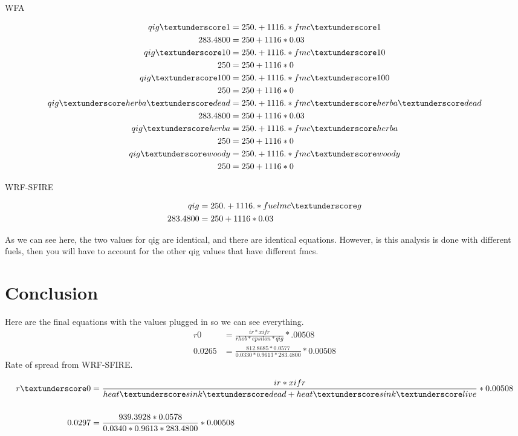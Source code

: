 \documentclass{article}
\newcommand\und{\textunderscore}
\begin{document}
WFA

\begin{equation}
\label{qig_WFA}
	\begin{split}
	qig\und 1         &= 250. + 1116.*fmc\und 1 \\
	283.4800 &= 250 + 1116 * 0.03 \\
qig\und 10        &= 250. + 1116.*fmc\und 10 \\
250 &= 250 + 1116 * 0 \\
qig\und 100       &= 250. + 1116.*fmc\und 100 \\
250 &= 250 + 1116 * 0 \\
qig\und herba\und dead &= 250. + 1116.*fmc\und herba\und dead \\
283.4800 &= 250 + 1116 * 0.03 \\
qig\und herba     &= 250. + 1116.*fmc\und herba \\
250 &= 250 + 1116 * 0 \\
qig\und woody     &= 250. + 1116.*fmc\und woody \\
250 &= 250 + 1116 * 0 
\end{split}
\end{equation}

WRF-SFIRE


\begin{equation}
	\begin{split}
		qig &= 250. + 1116.*fuelmc \textunderscore g \\
		283.4800 &= 250 + 1116 * 0.03
	\end{split}
\end{equation}

As we can see here, the two values for qig are identical, and there are identical equations. However, is this analysis is done with different fuels, then you will have to account for the other qig values that have different fmcs. 


\section{Conclusion}
Here are the final equations with the values plugged in so we can see everything. 
\begin{equation}
	\label{WRF-ROS}
	\begin{split}
		r0 &= \frac{ir*xifr}{rhob * epsilon *qig} * .00508 \\
		0.0265 &= \frac{812.8685 * 0.0577}{0.0330 * 0.9613 * 283.4800} * 0.00508
	\end{split}
\end{equation}
Rate of spread from WRF-SFIRE. 

	\begin{equation}
	\label{r0_WFA_2}
	\begin{split}
	r\und 0 &= \frac{ir * xifr}{heat\und sink\und dead + heat\und sink\und live} * 0.00508 \\
	\\
	0.0297 &= \frac{939.3928 * 0.0578}{0.0340 * 0.9613 * 283.4800} * 0.00508
	\end{split}
\end{equation}
\end{document}

